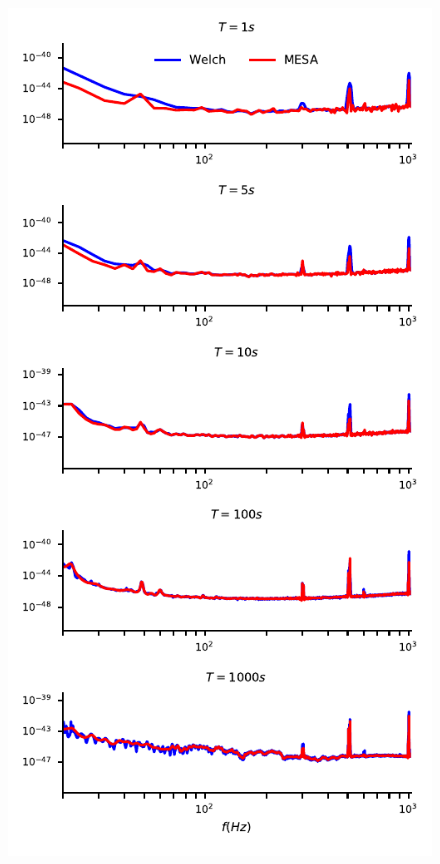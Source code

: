 \documentclass[twocolumn,showpacs,preprintnumbers,nofootinbib,prd,
superscriptaddress,10pt]{revtex4-1}
\begin{document}
\begin{figure}
	\includegraphics{Images/comparison_LVC_data/comparison_LVC_data_overall_fake_False.pdf}
\end{figure}
\end{document}
